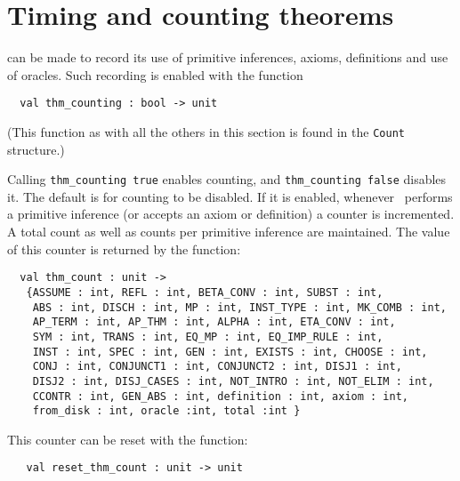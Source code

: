 \section{Timing and counting theorems}



\HOL{} can be made to record its use of primitive
inferences, axioms, definitions and use of oracles.  Such recording is
enabled with the function

\begin{boxed}
\begin{verbatim}
  val thm_counting : bool -> unit
\end{verbatim}
\end{boxed}

\noindent (This function as with all the others in this section is
found in the \texttt{Count} structure.)

Calling \verb+thm_counting true+ enables counting, and
\verb+thm_counting false+ disables it.  The default is for counting to
be disabled.  If it is enabled, whenever \HOL\ performs a primitive
inference (or accepts an axiom or definition) a
counter is incremented.  A total count as well as counts per
primitive inference are maintained.  The value of this counter is
returned by the function:

\begin{boxed}
\begin{verbatim}
  val thm_count : unit ->
   {ASSUME : int, REFL : int, BETA_CONV : int, SUBST : int,
    ABS : int, DISCH : int, MP : int, INST_TYPE : int, MK_COMB : int,
    AP_TERM : int, AP_THM : int, ALPHA : int, ETA_CONV : int,
    SYM : int, TRANS : int, EQ_MP : int, EQ_IMP_RULE : int,
    INST : int, SPEC : int, GEN : int, EXISTS : int, CHOOSE : int,
    CONJ : int, CONJUNCT1 : int, CONJUNCT2 : int, DISJ1 : int,
    DISJ2 : int, DISJ_CASES : int, NOT_INTRO : int, NOT_ELIM : int,
    CCONTR : int, GEN_ABS : int, definition : int, axiom : int,
    from_disk : int, oracle :int, total :int }
\end{verbatim}\end{boxed}

\noindent This counter can be reset with the function:

\begin{boxed}
\begin{verbatim}
   val reset_thm_count : unit -> unit
\end{verbatim}\end{boxed}

